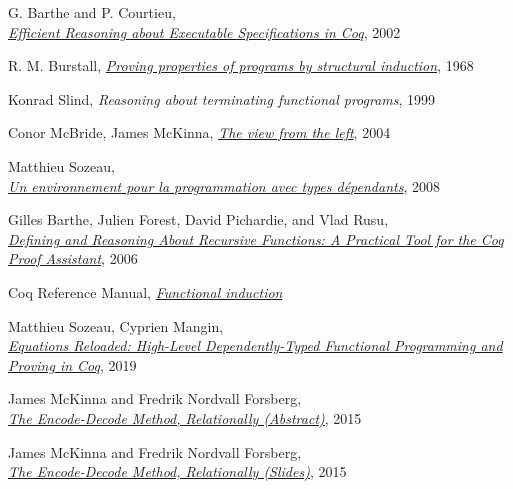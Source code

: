 \documentclass[declaration,mgr,english,shortabstract]{iithesis}
\begin{document}
\begin{thebibliography}{1}
    G. Barthe and P. Courtieu, \\
    \href{https://www.researchgate.net/publication/221302198_Efficient_Reasoning_about_Executable_Specifications_in_Coq}{\textit{Efficient Reasoning about Executable Specifications in Coq}},
    2002

    R. M. Burstall,
    \href{http://www.cse.chalmers.se/edu/year/2010/course/DAT140_Types/Burstall.pdf}{\textit{Proving properties of programs by structural induction}},
    1968

    Konrad Slind,
    \textit{Reasoning about terminating functional programs},
    1999

    Conor McBride, James McKinna,
    \href{https://www.researchgate.net/publication/220676549_The_view_from_the_left}{\textit{The view from the left}},
    2004

    Matthieu Sozeau, \\
    \href{https://www.irif.fr/~sozeau/research/publications/thesis-sozeau.pdf}{\textit{Un environnement pour la programmation avec types d\'{e}pendants}},
    2008

    Gilles Barthe, Julien Forest, David Pichardie, and Vlad Rusu, \\
    \href{https://www.researchgate.net/publication/48415012_Defining_and_Reasoning_About_Recursive_Functions_A_Practical_Tool_for_the_Coq_Proof_Assistant}{\textit{Defining and Reasoning About Recursive Functions: A Practical Tool for the Coq Proof Assistant}},
    2006

    Coq Reference Manual,
    \href{https://coq.inria.fr/refman/using/libraries/funind.html}{\textit{Functional induction}}

    Matthieu Sozeau, Cyprien Mangin, \\
    \href{https://www.irif.fr/~sozeau//research/publications/Equations_Reloaded-ICFP19.pdf}{\textit{Equations Reloaded: High-Level Dependently-Typed Functional Programming and Proving in Coq}},
    2019

    James McKinna and Fredrik Nordvall Forsberg, \\
    \href{http://cs.ioc.ee/types15/abstracts-book/contrib27.pdf}{\textit{The Encode-Decode Method, Relationally (Abstract)}},
    2015

    James McKinna and Fredrik Nordvall Forsberg, \\
    \href{https://personal.cis.strath.ac.uk/fredrik.nordvall-forsberg/talks/stp_dundee_2015/stp_dundee_2015-10-07.pdf}{\textit{The Encode-Decode Method, Relationally (Slides)}},
    2015


\end{thebibliography}
\end{document}
